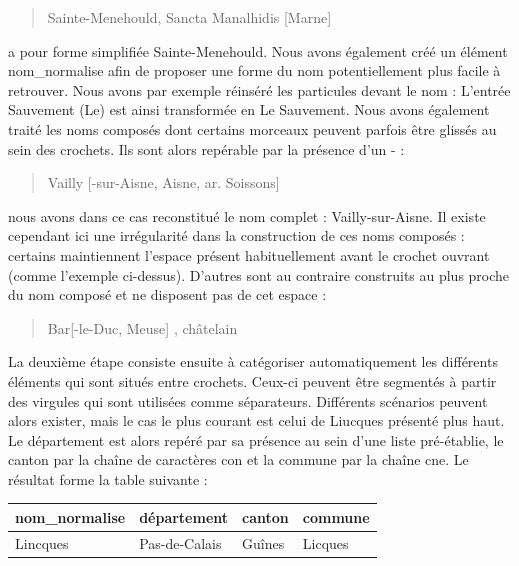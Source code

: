 \documentclass[a4paper,12pt,twoside]{book}
\begin{document}
	\begin{quotation}
		Sainte-Menehould, Sancta Manalhidis [Marne]
	\end{quotation}

	\noindent a pour forme simplifiée \og Sainte-Menehould\fg{}. Nous avons également créé un élément \og nom\_normalise\fg{} afin de proposer une forme du nom potentiellement plus facile à retrouver. Nous avons par exemple réinséré les particules devant le nom : L'entrée \og Sauvement (Le)\fg{} est ainsi transformée en \og Le Sauvement\fg{}. Nous avons également traité les noms composés dont certains morceaux peuvent parfois être glissés au sein des crochets. Ils sont alors repérable par la présence d'un \og - \fg{} : 
	
	\begin{quotation}
		Vailly [-sur-Aisne, Aisne, ar. Soissons]
	\end{quotation}
	
	\noindent nous avons dans ce cas reconstitué le nom complet : \og Vailly-sur-Aisne\fg{}. Il existe cependant ici une irrégularité dans la construction de ces noms composés : certains maintiennent l'espace présent habituellement avant le crochet ouvrant (comme l'exemple ci-dessus). D'autres sont au contraire construits au plus proche du nom composé et ne disposent pas de cet espace :
	
	\begin{quotation}
		Bar[-le-Duc, Meuse] , châtelain
	\end{quotation}
	
	La deuxième étape consiste ensuite à catégoriser automatiquement les différents éléments qui sont situés entre crochets. Ceux-ci peuvent être segmentés à partir des virgules qui sont utilisées comme séparateurs. Différents scénarios peuvent alors exister, mais le cas le plus courant est celui de \og Liucques\fg{} présenté plus haut. Le département est alors repéré par sa présence au sein d'une liste pré-établie, le canton par la chaîne de caractères \og con\fg{} et la commune par la chaîne \og cne\fg{}. Le résultat forme la table suivante :
	
	\begin{center}
		\begin{tabular}{|p{3cm}|p{3cm}|p{3cm}|p{3cm}|}
			\hline
			nom\_normalise & département & canton & commune \\ \hline
			Lincques & Pas-de-Calais & Guînes & Licques \\ \hline
		\end{tabular}
	\end{center}
	
\end{document}

